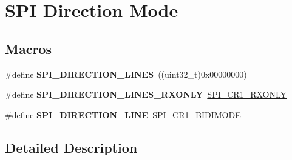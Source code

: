\hypertarget{group___s_p_i___direction__mode}{}\section{S\+PI Direction Mode}
\label{group___s_p_i___direction__mode}
\subsection*{Macros}
\begin{DoxyCompactItemize}
\item 
\#define {\bfseries S\+P\+I\+\_\+\+D\+I\+R\+E\+C\+T\+I\+O\+N\+\_\+L\+I\+N\+ES}~((uint32\+\_\+t)0x00000000)\hypertarget{group___s_p_i___direction__mode_gaa7cb7f4bf4eebbf91bcfaeb17ebba7f3}{}\label{group___s_p_i___direction__mode_gaa7cb7f4bf4eebbf91bcfaeb17ebba7f3}

\item 
\#define {\bfseries S\+P\+I\+\_\+\+D\+I\+R\+E\+C\+T\+I\+O\+N\+\_\+L\+I\+N\+E\+S\+\_\+\+R\+X\+O\+N\+LY}~\hyperlink{group___peripheral___registers___bits___definition_ga9ffecf774b84a8cdc11ab1f931791883}{S\+P\+I\+\_\+\+C\+R1\+\_\+\+R\+X\+O\+N\+LY}\hypertarget{group___s_p_i___direction__mode_ga444826cf94667f75503f54704b2fb391}{}\label{group___s_p_i___direction__mode_ga444826cf94667f75503f54704b2fb391}

\item 
\#define {\bfseries S\+P\+I\+\_\+\+D\+I\+R\+E\+C\+T\+I\+O\+N\+\_\+L\+I\+NE}~\hyperlink{group___peripheral___registers___bits___definition_ga43608d3c2959fc9ca64398d61cbf484e}{S\+P\+I\+\_\+\+C\+R1\+\_\+\+B\+I\+D\+I\+M\+O\+DE}\hypertarget{group___s_p_i___direction__mode_gab0f684caf5f1d6ac1e73d90a4778ab93}{}\label{group___s_p_i___direction__mode_gab0f684caf5f1d6ac1e73d90a4778ab93}

\end{DoxyCompactItemize}


\subsection{Detailed Description}
